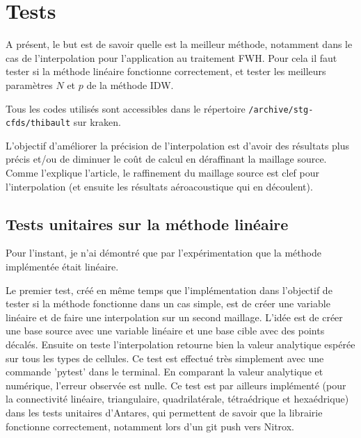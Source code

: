 

\section{Tests}
A présent, le but est de savoir quelle est la meilleur méthode, notamment dans le cas de l'interpolation pour l'application au traitement FWH. Pour cela il faut tester si la méthode linéaire fonctionne correctement, et tester les meilleurs paramètres \(N\) et \(p\) de la méthode IDW.

Tous les codes utilisés sont accessibles dans le répertoire \texttt{/archive/stg-cfds/thibault} sur kraken.

L'objectif d'améliorer la précision de l'interpolation est d'avoir des résultats plus précis et/ou de diminuer le coût de calcul en déraffinant la maillage source.
Comme l'explique l'article\cite{schoder2019}, le raffinement du maillage source est clef pour l'interpolation (et ensuite les résultats aéroacoustique qui en découlent).

\subsection{Tests unitaires sur la méthode linéaire}

Pour l'instant, je n'ai démontré que par l'expérimentation que la méthode implémentée était linéaire.

Le premier test, créé en même temps que l'implémentation dans l'objectif de tester si la méthode fonctionne dans un cas simple, est de créer une variable linéaire et de faire une interpolation sur un second maillage. L'idée est de créer une base source avec une variable linéaire et une base cible avec des points décalés. Ensuite on teste l'interpolation retourne bien la valeur analytique espérée sur tous les types de cellules. Ce test est effectué très simplement avec une commande 'pytest' dans le terminal. En comparant la valeur analytique et numérique, l'erreur observée est nulle. Ce test est par ailleurs implémenté (pour la connectivité linéaire, triangulaire, quadrilatérale, tétraédrique et hexaédrique) dans les tests unitaires d'Antares, qui permettent de savoir que la librairie fonctionne correctement, notamment lors d'un git push vers Nitrox.

